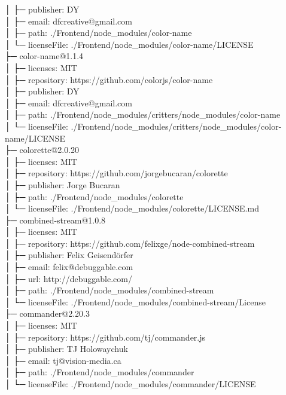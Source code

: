 │  ├─ publisher: DY\\
│  ├─ email: dfcreative@gmail.com\\
│  ├─ path: ./Frontend/node\_modules/color-name\\
│  └─ licenseFile: ./Frontend/node\_modules/color-name/LICENSE\\
├─ color-name@1.1.4\\
│  ├─ licenses: MIT\\
│  ├─ repository: https://github.com/colorjs/color-name\\
│  ├─ publisher: DY\\
│  ├─ email: dfcreative@gmail.com\\
│  ├─ path: ./Frontend/node\_modules/critters/node\_modules/color-name\\
│  └─ licenseFile: ./Frontend/node\_modules/critters/node\_modules/color-name/LICENSE\\
├─ colorette@2.0.20\\
│  ├─ licenses: MIT\\
│  ├─ repository: https://github.com/jorgebucaran/colorette\\
│  ├─ publisher: Jorge Bucaran\\
│  ├─ path: ./Frontend/node\_modules/colorette\\
│  └─ licenseFile: ./Frontend/node\_modules/colorette/LICENSE.md\\
├─ combined-stream@1.0.8\\
│  ├─ licenses: MIT\\
│  ├─ repository: https://github.com/felixge/node-combined-stream\\
│  ├─ publisher: Felix Geisendörfer\\
│  ├─ email: felix@debuggable.com\\
│  ├─ url: http://debuggable.com/\\
│  ├─ path: ./Frontend/node\_modules/combined-stream\\
│  └─ licenseFile: ./Frontend/node\_modules/combined-stream/License\\
├─ commander@2.20.3\\
│  ├─ licenses: MIT\\
│  ├─ repository: https://github.com/tj/commander.js\\
│  ├─ publisher: TJ Holowaychuk\\
│  ├─ email: tj@vision-media.ca\\
│  ├─ path: ./Frontend/node\_modules/commander\\
│  └─ licenseFile: ./Frontend/node\_modules/commander/LICENSE\\
